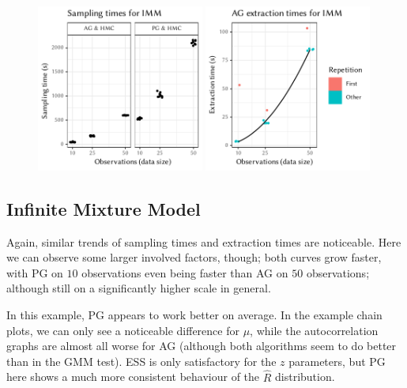 \cleartoverso
\FloatBlock

\begin{figure}[t!]
  \centering
  \includegraphics[width=0.49\textwidth]{figures/IMM-sampling_times}
  \includegraphics[width=0.49\textwidth]{figures/IMM-compile_times}
  \caption{}
  \label{fig:plots-imm}
\end{figure}

\subsection*{Infinite Mixture Model}

Again, similar trends of sampling times and extraction times are noticeable.  Here we can observe
some larger involved factors, though; both curves grow faster, with PG on \(10\) observations even
being faster than AG on \(50\) observations; although still on a significantly higher scale in
general.

In this example, PG appears to work better on average.  In the example chain plots, we can only see
a noticeable difference for \(\mu\), while the autocorrelation graphs are almost all worse for AG
(although both algorithms seem to do better than in the GMM test).  ESS is only satisfactory for the
\(z\) parameters, but PG here shows a much more consistent behaviour of the \(\widehat{R}\)
distribution.


